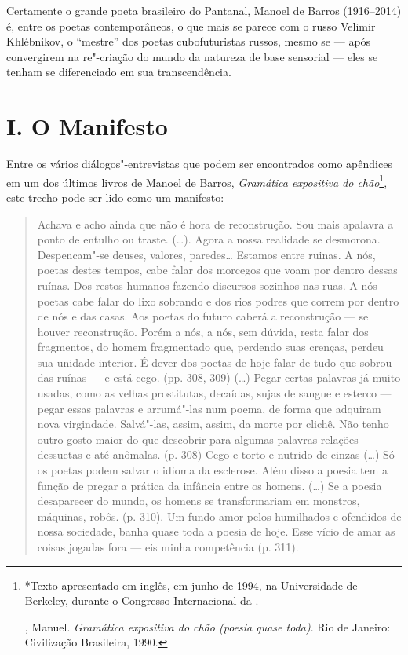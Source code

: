Certamente o grande poeta brasileiro do Pantanal, Manoel de Barros
(1916--2014) é, entre os poetas contemporâneos, o que mais se parece
com o russo Velimir Khlébnikov, o ``mestre'' dos poetas cubofuturistas
russos, mesmo se --- após convergirem na re"-criação do mundo da natureza
de base sensorial --- eles se tenham se diferenciado em sua
transcendência.

\section{I. O Manifesto}

Entre os vários diálogos"-entrevistas que podem ser encontrados como
apêndices em um dos últimos livros de Manoel de Barros, \emph{Gramática
expositiva do chão}\footnote{*Texto apresentado em inglês, em junho de
  1994, na Universidade de Berkeley, durante o Congresso Internacional da .

, Manuel. \emph{Gramática expositiva do chão (poesia quase
  toda)}. Rio de Janeiro: Civilização Brasileira, 1990.}, este trecho
pode ser lido como um manifesto:

\begin{quote}
Achava e acho ainda que não é hora de reconstrução. Sou mais apalavra a
ponto de entulho ou traste. (\ldots{}). Agora a nossa realidade se desmorona.
Despencam"-se deuses, valores, paredes\ldots{} Estamos entre ruinas. A nós,
poetas destes tempos, cabe falar dos morcegos que voam por dentro dessas
ruínas. Dos restos humanos fazendo discursos sozinhos nas ruas. A nós
poetas cabe falar do lixo sobrando e dos rios podres que correm por
dentro de nós e das casas. Aos poetas do futuro caberá a reconstrução ---
se houver reconstrução. Porém a nós, a nós, sem dúvida, resta falar
dos fragmentos, do homem fragmentado que, perdendo suas crenças, perdeu
sua unidade interior. É dever dos poetas de hoje falar de tudo que
sobrou das ruínas --- e está cego. (pp. 308, 309) (\ldots{}) Pegar certas
palavras já muito usadas, como as velhas prostitutas, decaídas, sujas de
sangue e esterco --- pegar essas palavras e arrumá"-las num poema, de
forma que adquiram nova virgindade. Salvá"-las, assim, assim, da morte
por clichê. Não tenho outro gosto maior do que descobrir para algumas
palavras relações dessuetas e até anômalas. (p. 308) Cego e torto e
nutrido de cinzas (\ldots{}) Só os poetas podem salvar o idioma da esclerose.
Além disso a poesia tem a função de pregar a prática da infância entre
os homens. (\ldots{}) Se a poesia desaparecer do mundo, os homens se
transformariam em monstros, máquinas, robôs. (p. 310). Um fundo amor
pelos humilhados e ofendidos de nossa sociedade, banha quase toda a
poesia de hoje. Esse vício de amar as coisas jogadas fora --- eis minha
competência (p. 311).
\end{quote}

